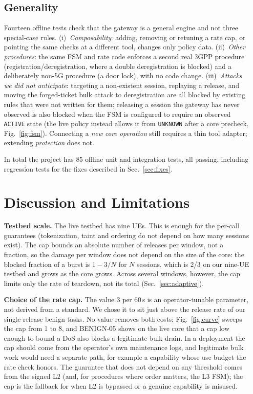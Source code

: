\documentclass[conference]{IEEEtran}
\newcommand{\code}[1]{\texttt{\small #1}}
\begin{document}
\subsection{Generality}
Fourteen offline tests check that the gateway is a general engine and not three
special-case rules. (i)~\emph{Composability}: adding, removing or retuning a rate cap, or
pointing the same checks at a different tool, changes only policy data. (ii)~\emph{Other
procedures}: the same FSM and rate code enforces a second real 3GPP procedure
(registration/deregistration, where a double deregistration is blocked) and a deliberately
non-5G procedure (a door lock), with no code change. (iii)~\emph{Attacks we did not
anticipate}: targeting a non-existent session, replaying a release, and moving the
forged-ticket bulk attack to deregistration are all blocked by existing rules that were not
written for them; releasing a session the gateway has never observed is also blocked when the
FSM is configured to require an observed \code{ACTIVE} state (the live policy instead allows
it from \code{UNKNOWN} after a core precheck, Fig.~\ref{fig:fsm}). Connecting a \emph{new core
operation} still requires a thin tool adapter; extending \emph{protection} does not.

In total the project has 85 offline unit and integration tests, all passing, including
regression tests for the fixes described in Sec.~\ref{sec:fixes}.

\section{Discussion and Limitations}
\label{sec:disc}

\textbf{Testbed scale.} The live testbed has nine UEs. This is enough for the per-call
guarantees (tokenization, taint and ordering do not depend on how many sessions exist). The
cap bounds an absolute number of releases per window, not a fraction, so the damage per window
does not depend on the size of the core: the blocked fraction of a burst is $1-3/N$ for $N$
sessions, which is 2/3 on our nine-UE testbed and grows as the core grows. Across several
windows, however, the cap limits only the rate of teardown, not its total (Sec.~\ref{sec:adaptive}).

\textbf{Choice of the rate cap.} The value 3 per 60\,s is an operator-tunable parameter, not
derived from a standard. We chose it to sit just above the release rate of our single-release
benign tasks. No value removes both costs: Fig.~\ref{fig:curve} sweeps the cap from 1 to 8, and
BENIGN-05 shows on the live core that a cap low enough to bound a DoS also blocks a legitimate bulk
drain. In a deployment the cap should come from the operator's own maintenance logs, and
legitimate bulk work would need a separate path, for example a capability whose use budget the
rate check honors. The guarantee that does not depend on any threshold comes from the signed L2
(and, for procedures where order matters, the L3 FSM); the cap is the fallback for when L2 is
bypassed or a genuine capability is misused.
\end{document}
